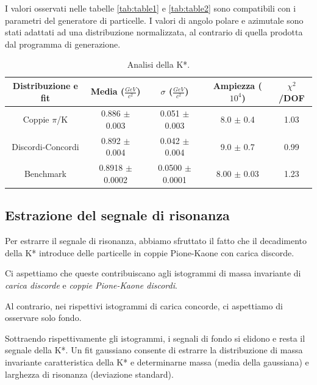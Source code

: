 \documentclass[12pt, a4paper]{article}
\begin{document}
I valori osservati nelle tabelle \ref{tab:table1} e \ref{tab:table2} sono compatibili con i parametri del generatore di particelle.
I valori di angolo polare e azimutale sono stati adattati ad una distribuzione normalizzata, al contrario di quella prodotta dal programma di generazione.

\begin{table}[H]
  \begin{center}
    \caption{Analisi della K*.}
    \label{tab:table3}
    \begin{tabular}{c|c|c|c|c} %
      \textbf{Distribuzione e fit} & 
      \textbf{Media ($\frac{GeV}{c^2}$)} & 
      \textbf{$\sigma$ ($\frac{GeV}{c^2}$)} & 
      \textbf{Ampiezza ($10^4$)} & 
      \textbf{$\chi^2$/DOF}\\
      
      \hline
      Coppie $\pi$/K  & 0.886 $\pm$ 0.003 &0.051 $\pm$ 0.003  & 8.0 $\pm$ 0.4 & 1.03\\
      Discordi-Concordi & 0.892 $\pm$ 0.004 & 0.042 $\pm$ 0.004 & 9.0 $\pm$ 0.7 & 0.99\\
      Benchmark & 0.8918 $\pm$ 0.0002 & 0.0500 $\pm$ 0.0001 & 8.00 $\pm$ 0.03  &  1.23\\
    \end{tabular}
  \end{center}
\end{table}

\subsection{Estrazione del segnale di risonanza}
Per estrarre il segnale di risonanza, abbiamo sfruttato il fatto che il decadimento della K* introduce delle particelle in coppie Pione-Kaone con carica discorde. 

Ci aspettiamo che queste contribuiscano agli istogrammi di massa invariante di \textit{carica discorde} e \textit{coppie Pione-Kaone discordi}.

Al contrario, nei rispettivi istogrammi di carica concorde, ci aspettiamo di osservare solo fondo.

Sottraendo rispettivamente gli istogrammi, i segnali di fondo si elidono e resta il segnale della K*.
Un fit gaussiano consente di estrarre la distribuzione di massa invariante caratteristica della K* e determinarne massa (media della gaussiana) e larghezza di risonanza (deviazione standard).
\end{document}
